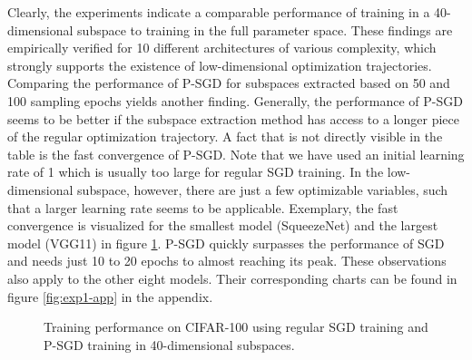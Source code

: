 \documentclass[11pt, a4paper]{article}
\begin{document}
Clearly, the experiments indicate a comparable performance of training in a 40-dimensional subspace to training in the full parameter space. These findings are empirically verified for 10 different architectures of various complexity, which strongly supports the existence of low-dimensional optimization trajectories. Comparing the performance of P-SGD for subspaces extracted based on 50 and 100 sampling epochs yields another finding. Generally, the performance of P-SGD seems to be better if the subspace extraction method has access to a longer piece of the regular optimization trajectory. A fact that is not directly visible in the table is the fast convergence of P-SGD. Note that we have used an initial learning rate of 1 which is usually too large for regular SGD training. In the low-dimensional subspace, however, there are just a few optimizable variables, such that a larger learning rate seems to be applicable. Exemplary, the fast convergence is visualized for the smallest model (SqueezeNet) and the largest model (VGG11) in figure \ref{fig:exp1}. P-SGD quickly surpasses the performance of SGD and needs just 10 to 20 epochs to almost reaching its peak. These observations also apply to the other eight models. Their corresponding charts can be found in figure \ref{fig:exp1-app} in the appendix.

\begin{figure}[!h]
\centering
{} %
\caption{\centering Training performance on CIFAR-100 using regular SGD training and P-SGD training in 40-dimensional subspaces.}
\label{fig:exp1}
\end{figure}
\end{document}

